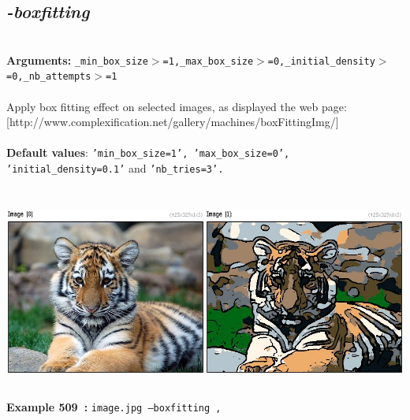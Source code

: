 \documentclass[a4paper,11pt,twoside]{book}
\begin{document}
\subsection{\emph{-boxfitting} }\vspace*{-0.5em}
~\\\textbf{Arguments: } 
{\small \texttt{\_min\_box\_size$>$=1,\_max\_box\_size$>$=0,\_initial\_density$>$=0,\_nb\_attempts$>$=1}}\\~\\
Apply box fitting effect on selected images, as displayed the web page:
[http://www.complexification.net/gallery/machines/boxFittingImg/]
~\\~\\\textbf{Default values}: {\small \texttt{'min\_box\_size=1', 'max\_box\_size=0', 'initial\_density=0.1'} and \texttt{'nb\_tries=3'.}}
\begin{center}\includegraphics[keepaspectratio=true,height=7cm,width=\textwidth]{img/gmic_def509.jpg}\\
{\footnotesize \textbf{Example 509~:} \texttt{image.jpg --boxfitting ,}}
\end{center}
\end{document}
